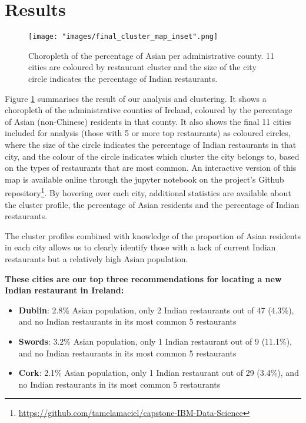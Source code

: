 \documentclass[a4paper,11pt]{article}
\begin{document}
\section{Results}\label{sec: results}
%
\begin{figure}[htb]
   \centering
   \texttt{[image: "images/final\_cluster\_map\_inset".png]}
      \caption{Choropleth of the percentage of Asian per administrative county. 11 cities are coloured by restaurant cluster and the size of the city circle indicates the percentage of Indian restaurants.}
      \label{fig:final cluster map}
\end{figure}
%
Figure \ref{fig:final cluster map} summarises the result of our analysis and clustering. It shows a choropleth of the administrative counties of Ireland, coloured by the percentage of Asian (non-Chinese) residents in that county. It also shows the final 11 cities included for analysis (those with 5 or more top restaurants) as coloured circles, where the size of the circle indicates the percentage of Indian restaurants in that city, and the colour of the circle indicates which cluster the city belongs to, based on the types of restaurants that are most common. An interactive version of this map is available online through the jupyter notebook on the project's Github repository\footnote{\url{https://github.com/tamelamaciel/capstone-IBM-Data-Science}}. %
By hovering over each city, additional statistics are available about the cluster profile, the percentage of Asian residents and the percentage of Indian restaurants.

The cluster profiles combined with knowledge of the proportion of Asian residents in each city allows us to clearly identify those with a lack of current Indian restaurants but a relatively high Asian population. 

\textbf{These cities are our top three recommendations for locating a new Indian restaurant in Ireland:}

\begin{itemize}
	\item \textbf{Dublin}: 2.8\% Asian population, only 2 Indian restaurants out of 47 (4.3\%), and no Indian restaurants in its most common 5 restaurants
	\item \textbf{Swords}: 3.2\% Asian population, only 1 Indian restaurant out of 9 (11.1\%), and no Indian restaurants in its most common 5 restaurants
	\item \textbf{Cork}: 2.1\% Asian population, only 1 Indian restaurant out of 29 (3.4\%), and no Indian restaurants in its most common 5 restaurants
\end{itemize}
\end{document}
